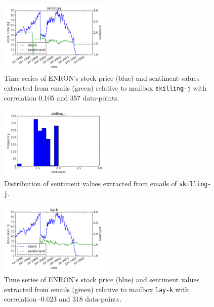 \documentclass{vldb}
\begin{document}
\begin{figure}[h!]
\centering
\includegraphics[width=0.48\textwidth]{imgs/sentiment_vs_stock_skilling-j.pdf}
\caption{Time series of ENRON's stock price (blue) and sentiment values
	extracted from emails (green) relative to mailbox \texttt{skilling-j} with
correlation 0.105 and 357 data-points.}
\label{fig:sentiment_vs_stock_skilling}
\end{figure}

\begin{figure}[h!]
\centering
\includegraphics[width=0.48\textwidth]{imgs/hist/sentiment_vs_stock_skilling-j_hist.pdf}
\caption{Distribution of sentiment values extracted from emails of
	\texttt{skilling-j}.}
\label{fig:sentiment_dist_hist_skilling}
\end{figure}

\begin{figure}[h!]
\centering
\includegraphics[width=0.48\textwidth]{imgs/sentiment_vs_stock_lay-k.pdf}
\caption{Time series of ENRON's stock price (blue) and sentiment values
	extracted from emails (green) relative to mailbox \texttt{lay-k} with
correlation -0.023 and 318 data-points.}
\label{fig:sentiment_vs_stock_lay}
\end{figure}
\end{document}
